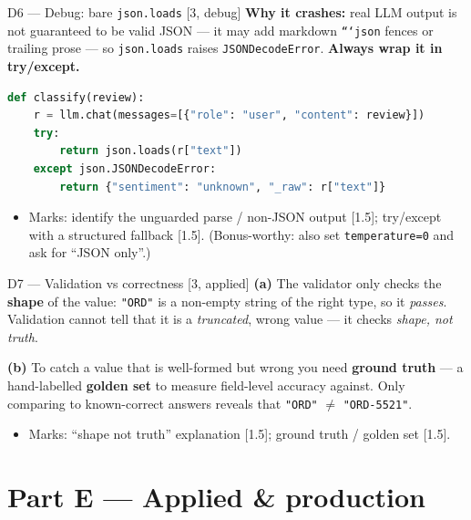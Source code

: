 \documentclass[aspectratio=169,11pt]{beamer}
\begin{document}
\begin{frame}[fragile]{D6 --- Debug: bare \texttt{json.loads} \hfill [3, debug]}
\textbf{Why it crashes:} real LLM output is not guaranteed to be valid JSON --- it may add markdown \texttt{```json} fences or trailing prose --- so \texttt{json.loads} raises \texttt{JSONDecodeError}. \textbf{Always wrap it in try/except.}
\begin{lstlisting}[language=Python]
def classify(review):
    r = llm.chat(messages=[{"role": "user", "content": review}])
    try:
        return json.loads(r["text"])
    except json.JSONDecodeError:
        return {"sentiment": "unknown", "_raw": r["text"]}
\end{lstlisting}
\begin{itemize}
  \item Marks: identify the unguarded parse / non-JSON output [1.5]; try/except with a structured fallback [1.5]. (Bonus-worthy: also set \texttt{temperature=0} and ask for ``JSON only''.)
\end{itemize}
\end{frame}

\begin{frame}{D7 --- Validation vs correctness \hfill [3, applied]}
\textbf{(a)} The validator only checks the \textbf{shape} of the value: \texttt{"ORD"} is a non-empty string of the right type, so it \emph{passes}. Validation cannot tell that it is a \emph{truncated}, wrong value --- it checks \emph{shape, not truth}.

\medskip
\textbf{(b)} To catch a value that is well-formed but wrong you need \textbf{ground truth} --- a hand-labelled \textbf{golden set} to measure field-level accuracy against. Only comparing to known-correct answers reveals that \texttt{"ORD"} $\neq$ \texttt{"ORD-5521"}.
\begin{itemize}
  \item Marks: ``shape not truth'' explanation [1.5]; ground truth / golden set [1.5].
\end{itemize}
\end{frame}

\section{Part E --- Applied \& production}
\end{document}
